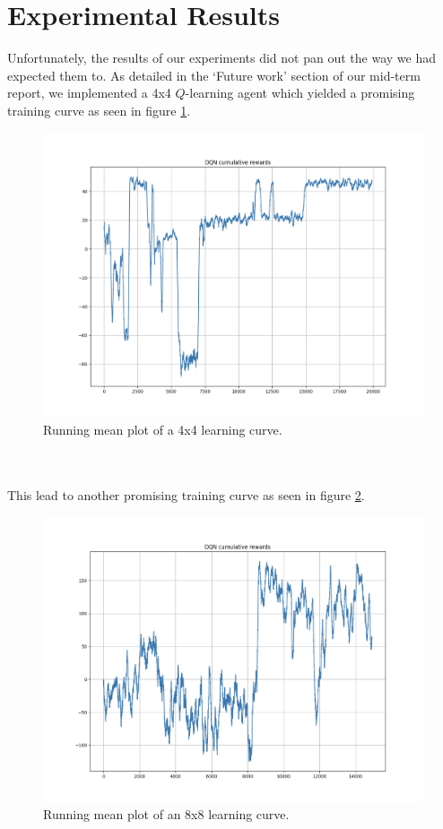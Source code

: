\documentclass{article}
\begin{document}
\section{\label{doc:exp_results}Experimental Results}
Unfortunately, the results of our experiments did not pan out the way we had expected them to. As detailed in the `Future work' section of our mid-term report, we implemented a 4x4 $Q$-learning agent which yielded a promising training curve as seen in figure \ref{fig:4x4_curve}.
\begin{figure}[ht]
\centering
\includegraphics[width=0.9\linewidth]{figures/4x4_model_cumulative_rewards_curve.png}
\caption{\label{fig:4x4_curve}Running mean plot of a 4x4 learning curve.}
\end{figure}
\\\\
This lead to another promising training curve as seen in figure \ref{fig:8x8_good_curve}.
\begin{figure}[ht]
    \centering
    \includegraphics[width=0.9\linewidth]{figures/8x8_model_cumulative_reward_curve.png}
    \caption{\label{fig:8x8_good_curve}Running mean plot of an 8x8 learning curve.}
\end{figure}
\end{document}
